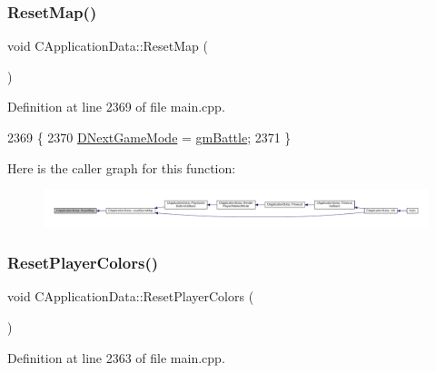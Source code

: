 \subsubsection{\texorpdfstring{Reset\+Map()}{ResetMap()}}
{\footnotesize\ttfamily void C\+Application\+Data\+::\+Reset\+Map (\begin{DoxyParamCaption}{ }\end{DoxyParamCaption})\hspace{0.3cm}{\ttfamily [protected]}}



Definition at line 2369 of file main.\+cpp.


\begin{DoxyCode}
2369                                \{
2370     \hyperlink{classCApplicationData_a3b67edeacd70201dcf96fa9fa8aa2107}{DNextGameMode} = \hyperlink{classCApplicationData_ac8ac37a4c8bb871036fbbdc6a072e403a00a1759bd54eaaa07aab7575dbae51fc}{gmBattle};
2371 \}
\end{DoxyCode}
Here is the caller graph for this function\+:\nopagebreak
\begin{figure}[H]
\begin{center}
\leavevmode
\includegraphics[width=350pt]{classCApplicationData_a18ae4aed31d9ef2416059e66babb05b0_icgraph}
\end{center}
\end{figure}
\hypertarget{classCApplicationData_a46653e8a3ed079f3921ec0257e49eb89}{}\label{classCApplicationData_a46653e8a3ed079f3921ec0257e49eb89} 
\subsubsection{\texorpdfstring{Reset\+Player\+Colors()}{ResetPlayerColors()}}
{\footnotesize\ttfamily void C\+Application\+Data\+::\+Reset\+Player\+Colors (\begin{DoxyParamCaption}{ }\end{DoxyParamCaption})\hspace{0.3cm}{\ttfamily [protected]}}



Definition at line 2363 of file main.\+cpp.



